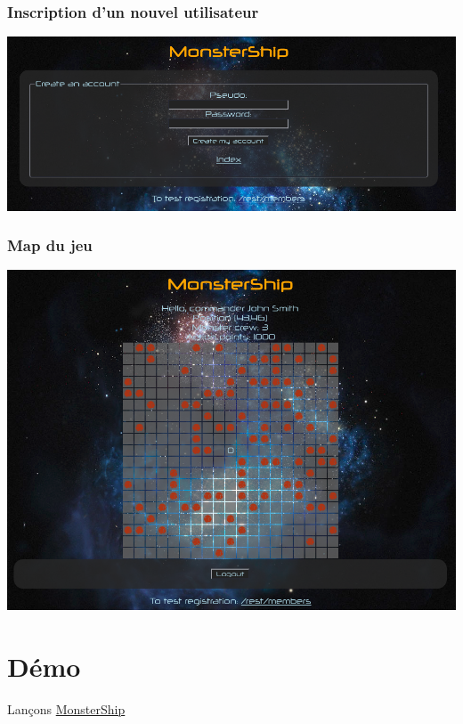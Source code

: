 \documentclass{beamer}
\begin{document}
		\begin{frame}
		\frametitle{Inscription d'un nouvel utilisateur}
			\includegraphics[width=1\textwidth]{images/inscription.png} 
		\end{frame}
		
		\begin{frame}
		\frametitle{Map du jeu}
			\includegraphics[width=1\textwidth]{images/home.png} 
		\end{frame}
		
	\section{Démo}
	  \begin{frame}
	    \begin{center}
        {\Huge Lançons \href{http://localhost:8080/monstership-web/index.xhtml}{MonsterShip}}
	    \end{center}
	  \end{frame}
		
\end{document}

